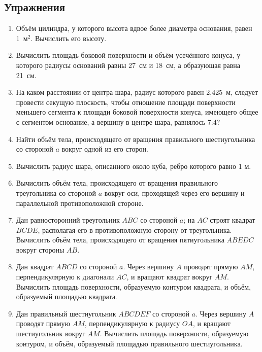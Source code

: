 {\small

\subsection*{Упражнения}

\begin{enumerate}[noitemsep]

\item 
Объём цилиндра, у которого высота вдвое более диаметра основания, равен 1~м$^2$.
Вычислить его высоту.

\item
Вычислить площадь боковой поверхности и объём усечённого конуса, у которого радиусы оснований равны 27~см и 18~см, а образующая равна 21~см.

\item
На каком расстоянии от центра шара, радиус которого равен 2,425~м, следует провести секущую плоскость, чтобы отношение площади поверхности меньшего сегмента к площади боковой поверхности конуса, имеющего общее с сегментом основание, а вершину в центре шара, равнялось 7:4?

\item
Найти объём тела, происходящего от вращения правильного шестиугольника со стороной $a$ вокруг одной из его сторон.

\item
Вычислить радиус шара, описанного около куба, ребро которого равно 1 м.

\item
Вычислить объём тела, происходящего от вращения правильного треугольника со стороной $a$ вокруг оси, проходящей через его вершину и параллельной противоположной стороне.

\item
Дан равносторонний треугольник $ABC$ со стороной $a$;
на $AC$ строят квадрат $BCDE$, располагая его в противоположную сторону от треугольника.
Вычислить объём тела, происходящего от вращения пятиугольника $ABEDC$ вокруг стороны $AB$.

\item
Дан квадрат $ABCD$ со стороной $a$.
Через вершину $A$ проводят прямую $AM$, перпендикулярную к диагонали $AC$, и вращают квадрат вокруг $AM$.
Вычислить площадь поверхности, образуемую контуром квадрата, и объём, образуемый площадью квадрата.

\item
Дан правильный шестиугольник $ABCDEF$ со стороной $a$.
Через вершину $A$ проводят прямую $AM$, перпендикулярную к радиусу $OA$, и вращают шестиугольник вокруг $AM$.
Вычислить площадь поверхности, образуемую контуром, и объём, образуемый площадью правильного шестиугольника.



\end{enumerate}}
